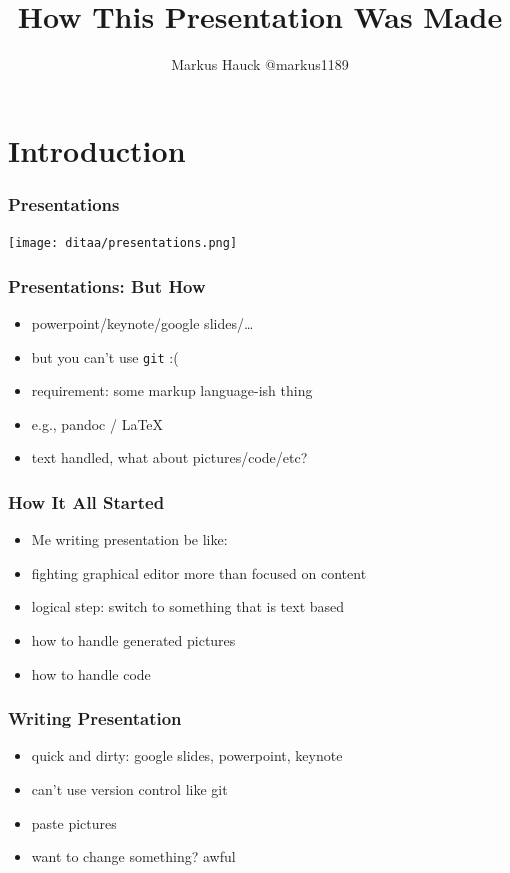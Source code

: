 \documentclass{beamer}
\title{How This Presentation Was Made}
\author{Markus Hauck @markus1189}
\begin{document}
\begin{frame}
  \titlepage{}
\end{frame}

\section{Introduction}\label{sec:introduction}

\begin{frame}
  \frametitle{Presentations}
  \begin{center}
    \texttt{[image: ditaa/presentations.png]}
  \end{center}
\end{frame}

\begin{frame}
  \frametitle{Presentations: But How}
  \begin{itemize}
  \item powerpoint/keynote/google slides/\ldots{}
  \item but you can't use \texttt{git} :(
  \item requirement: some markup language-ish thing
  \item e.g., pandoc / LaTeX
  \item text handled, what about pictures/code/etc?
  \end{itemize}
\end{frame}

\begin{frame}
  \frametitle{How It All Started}
  \begin{itemize}
  \item Me writing presentation be like:
  \item fighting graphical editor more than focused on content
  \item logical step: switch to something that is text based
  \item how to handle generated pictures
  \item how to handle code
  \end{itemize}
\end{frame}

\begin{frame}
  \frametitle{Writing Presentation}
  \begin{itemize}
  \item quick and dirty: google slides, powerpoint, keynote
  \item can't use version control like git
  \item paste pictures
  \item want to change something? awful
  \end{itemize}
\end{frame}
\end{document}
